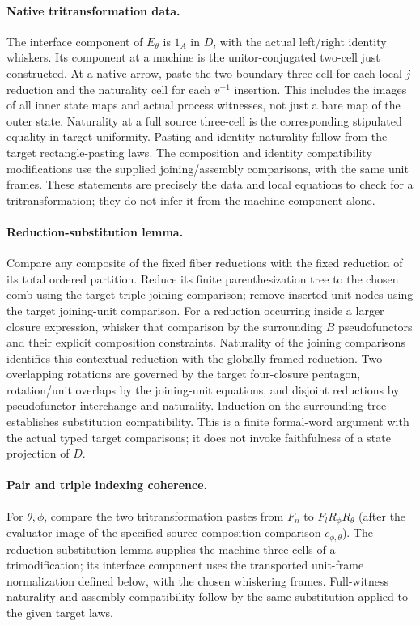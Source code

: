 \documentclass{article}
\begin{document}
\paragraph{Native tritransformation data.} The interface component of $E_\theta$ is $1_A$ in $D$, with the actual left/right identity whiskers. Its component at a machine is the unitor-conjugated two-cell just constructed. At a native arrow, paste the two-boundary three-cell for each local $j$ reduction and the naturality cell for each $v^{-1}$ insertion. This includes the images of all inner state maps and actual process witnesses, not just a bare map of the outer state. Naturality at a full source three-cell is the corresponding stipulated equality in target uniformity. Pasting and identity naturality follow from the target rectangle-pasting laws. The composition and identity compatibility modifications use the supplied joining/assembly comparisons, with the same unit frames. These statements are precisely the data and local equations to check for a tritransformation; they do not infer it from the machine component alone.

\paragraph{Reduction-substitution lemma.} Compare any composite of the fixed fiber reductions with the fixed reduction of its total ordered partition. Reduce its finite parenthesization tree to the chosen comb using the target triple-joining comparison; remove inserted unit nodes using the target joining-unit comparison. For a reduction occurring inside a larger closure expression, whisker that comparison by the surrounding $B$ pseudofunctors and their explicit composition constraints. Naturality of the joining comparisons identifies this contextual reduction with the globally framed reduction. Two overlapping rotations are governed by the target four-closure pentagon, rotation/unit overlaps by the joining-unit equations, and disjoint reductions by pseudofunctor interchange and naturality. Induction on the surrounding tree establishes substitution compatibility. This is a finite formal-word argument with the actual typed target comparisons; it does not invoke faithfulness of a state projection of $D$.

\paragraph{Pair and triple indexing coherence.} For $\theta,\phi$, compare the two tritransformation pastes from $F_n$ to $F_lR_\phi R_\theta$ (after the evaluator image of the specified source composition comparison $c_{\phi,\theta}$). The reduction-substitution lemma supplies the machine three-cells of a trimodification; its interface component uses the transported unit-frame normalization defined below, with the chosen whiskering frames. Full-witness naturality and assembly compatibility follow by the same substitution applied to the given target laws.
\end{document}
